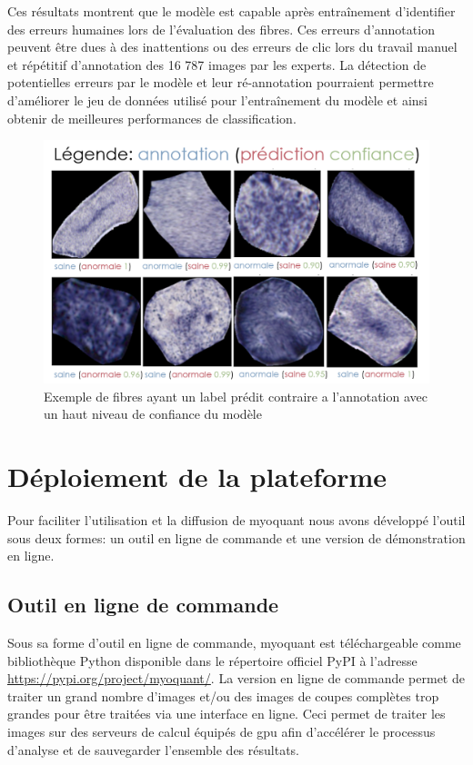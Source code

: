 Ces résultats montrent que le modèle est capable après entraînement d'identifier des erreurs humaines lors de l'évaluation des fibres. Ces erreurs d'annotation peuvent être dues à des inattentions ou des erreurs de clic lors du travail manuel et répétitif d'annotation des  16 787 images par les experts. La détection de potentielles erreurs par le modèle et leur ré-annotation pourraient permettre d'améliorer le jeu de données utilisé pour l'entraînement du modèle et ainsi obtenir de meilleures performances de classification.
\begin{figure}[htbp]
 \centering
 \includegraphics[width=1\textwidth]{figures/list_sdh_errors.png}
 \caption[Exemple de fibres ayant un label prédit contraire a l'annotation avec un haut niveau de confiance du modèle]{Exemple de fibres ayant un label prédit contraire a l'annotation avec un haut niveau de confiance du modèle}
 \label{fig:list_errors}
\end{figure}

\section{Déploiement de la plateforme}
Pour faciliter l'utilisation et la diffusion de \gls{myoquant} nous avons développé l'outil sous deux formes: un outil en ligne de commande et une version de démonstration en ligne.

\subsection{Outil en ligne de commande}
Sous sa forme d'outil en ligne de commande, \gls{myoquant} est téléchargeable comme bibliothèque Python disponible dans le répertoire officiel PyPI à l'adresse \href{https://pypi.org/project/myoquant/}{https://pypi.org/project/myoquant/}. La version en ligne de commande permet de traiter un grand nombre d'images et/ou des images de coupes complètes trop grandes pour être traitées via une interface en ligne. Ceci permet de traiter les images sur des serveurs de calcul équipés de \gls{gpu} afin d'accélérer le processus d'analyse et de sauvegarder l'ensemble des résultats.

